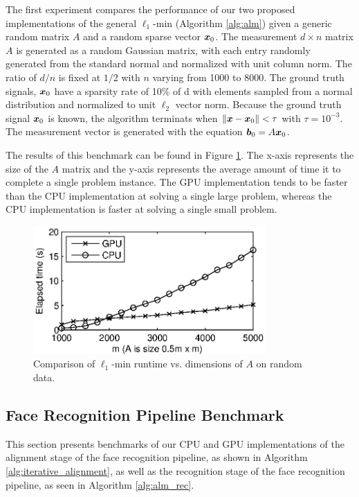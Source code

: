 \documentclass[10pt,twocolumn,letterpaper]{article}
\begin{document}
The first experiment compares the performance of our two proposed
implementations of the general $\ell_1$-min (Algorithm \eqref{alg:alm}) given a
generic random matrix $A$ and a random sparse vector ${\boldsymbol{x}}_0$.  The measurement
$d \times n$ matrix $A$ is generated as a random Gaussian matrix, with each
entry randomly generated from the standard normal and normalized with unit
column norm.  The ratio of $d/n$ is fixed at $1/2$ with $n$ varying from 1000 to 8000.
The ground truth signals, ${\boldsymbol{x}}_0$ have a sparsity rate of 10\% of d with
elements sampled from a normal distribution and normalized to unit $\ell_2$ vector
norm.  Because the ground truth signal ${\boldsymbol{x}}_0$ is known, the algorithm
terminats when $\|{\boldsymbol x}-{\boldsymbol x}_0\| < \tau$ with $\tau=10^{-3}$.  The measurement
vector is generated with the equation ${\boldsymbol{b}}_0 = A {\boldsymbol{x}}_0$.   

The results of this benchmark can be found in Figure \ref{fig:random_data}.
The x-axis represents the size of the $A$ matrix and the y-axis represents the
average amount of time it to complete a single problem instance.  The GPU
implementation tends to be faster than the CPU implementation at solving a
single large problem, whereas the CPU implementation is faster at solving a
single small problem.  
\begin{figure}
\begin{center}
\includegraphics[width=3.5in]{figures/time_vs_matrix_size_constant_tol}
\end{center}
\caption{Comparison of $\ell_1$-min runtime vs. dimensions of $A$ on random data.}
\label{fig:random_data}
\end{figure}

\subsection{Face Recognition Pipeline Benchmark} 
\label{sec:benchmark}
This section presents benchmarks of our CPU and GPU implementations of the
alignment stage of the face recognition pipeline, as shown in Algorithm
\ref{alg:iterative_alignment}, as well as the recognition stage of the
face recognition pipeline, as seen in Algorithm \ref{alg:alm_rec}.
\end{document}
